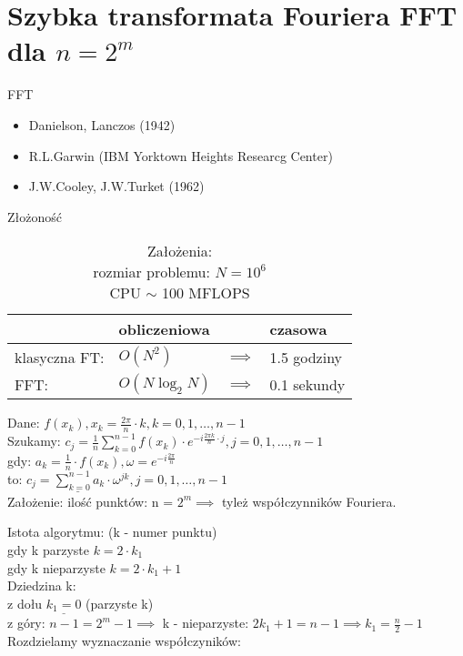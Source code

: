 \section{Szybka transformata Fouriera FFT dla $n=2^m$}
\begin{frame}[allowframebreaks]{FFT}
	\begin{itemize}
		\item Danielson, Lanczos (1942)
		\item R.L.Garwin (IBM Yorktown Heights Researcg Center)
		\item J.W.Cooley, J.W.Turket (1962)
	\end{itemize}
	\begin{table}
		\centering
		\caption{Złożoność}
		\begin{tabular}{l|lll}
			& obliczeniowa && czasowa \\
			\hline
			klasyczna FT: & $O(N^2)$ & $\implies$ & 1.5 godziny \\
			FFT: & $O(N\log_2N)$ & $\implies$ & 0.1 sekundy 
		\end{tabular}
		\caption*{Założenia: \\
			rozmiar problemu: $N = 10^6$ \\
			CPU $\sim$ 100 MFLOPS}
	\end{table}
	Dane: $f(x_k), x_k = \frac{2\pi}{n} \cdot k, k = 0, 1, \dots, n-1$ \\
	Szukamy: $c_j = \frac{1}{n} \sum\limits_{k = 0}^{n-1} f(x_k) \cdot e^{-i\frac{2\pi k}{n} \cdot j}, j = 0, 1, \dots, n-1$ \\
	gdy: $a_k = \frac{1}{n} \cdot f(x_k), \omega = e^{-i\frac{2\pi}{n}}$ \\
	to: $\underline{c_j = \sum\limits_{k = 0}^{n-1} a_k \cdot \omega^{jk}}, j = 0, 1, \dots, n-1$ \\
	Założenie: ilość punktów: n = $2^m \implies$ tyleż współczynników Fouriera. \\
	\begin{block}{Istota algorytmu:}
	(k - numer punktu) \\
	gdy k parzyste $k = 2 \cdot k_1$ \\
	gdy k nieparzyste $k = 2 \cdot k_1 + 1$ \\
	Dziedzina k: \\
	z dołu $\underline{k_1 = 0}$ (parzyste k)  \\
	z góry: $n-1 = 2^m - 1 \implies$ k - nieparzyste: $2k_1 + 1 = n-1 \implies k_1 = \frac{n}{2} - 1$ \\
	Rozdzielamy wyznaczanie współczyników: 

\end{block}
\end{frame}
